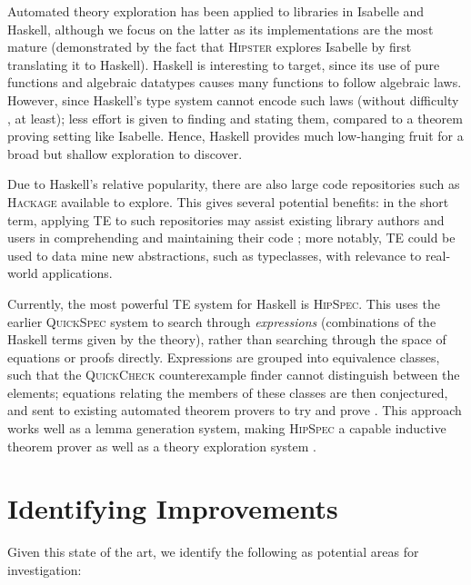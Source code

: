 \documentclass{eceasst}
\begin{document}
Automated theory exploration has been applied to libraries in Isabelle
and Haskell, although we focus on the latter as its implementations are
the most mature (demonstrated by the fact that \textsc{Hipster} explores
Isabelle by first translating it to Haskell). Haskell is interesting to target,
since its use of pure functions and algebraic datatypes causes many functions to
follow algebraic laws. However, since Haskell's type system cannot encode such
laws (without difficulty \cite{lindley2014hasochism}, at least); less
effort is given to finding and stating them, compared to a theorem proving
setting like Isabelle. Hence, Haskell provides much low-hanging fruit for a
broad but shallow exploration to discover.

Due to Haskell's relative popularity, there are also large code repositories
such as \textsc{Hackage} available to explore. This gives several potential
benefits: in the short term, applying TE to such repositories may assist
existing library authors and users in comprehending and maintaining their code
\cite{QuickSpec}; more notably, TE could be used to data mine new abstractions,
such as typeclasses, with relevance to real-world applications.

Currently, the most powerful TE system for Haskell is \textsc{HipSpec}.
This uses the earlier \textsc{QuickSpec} system to search through
\emph{expressions} (combinations of the Haskell terms given by the theory),
rather than searching through the space of equations or proofs directly.
Expressions are grouped into equivalence classes, such that the
\textsc{QuickCheck} counterexample finder cannot distinguish between the
elements; equations relating the members of these classes are then conjectured,
and sent to existing automated theorem provers to try and prove
\cite{rosen2012proving}. This approach works well as a lemma generation system,
making \textsc{HipSpec} a capable inductive theorem prover as well as a theory
exploration system \cite{claessen2013automating}.

\section{Identifying Improvements}\label{improve}

Given this state of the art, we identify the following as potential
areas for investigation:
\end{document}
